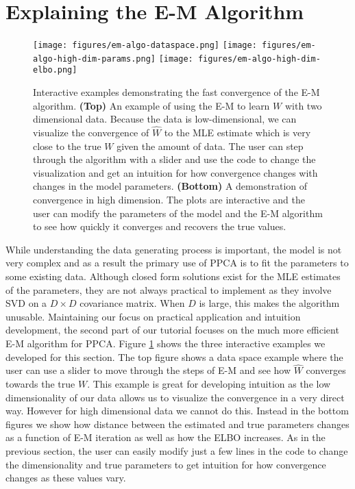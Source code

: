 \section{Explaining the E-M Algorithm}
\begin{figure}[h]
    \centering
    \texttt{[image: figures/em-algo-dataspace.png]}
    \texttt{[image: figures/em-algo-high-dim-params.png]}
    \texttt{[image: figures/em-algo-high-dim-elbo.png]}
    \caption{Interactive examples demonstrating the fast convergence of the E-M algorithm. \textbf{(Top)} An example of using the E-M to learn $W$ with two dimensional data. Because the data is low-dimensional, we can visualize the convergence of $\hat{W}$ to the MLE estimate which is very close to the true $W$ given the amount of data. The user can step through the algorithm with a slider and use the code to change the visualization and get an intuition for how convergence changes with changes in the model parameters. \textbf{(Bottom)} A demonstration of convergence in high dimension. The plots are interactive and the user can modify the parameters of the model and the E-M algorithm to see how quickly it converges and recovers the true values.}
    \label{fig:em}
\end{figure}
While understanding the data generating process is important, the model is not very complex and as a result the primary use of PPCA is to fit the parameters to some existing data. Although closed form solutions exist for the MLE estimates of the parameters, they are not always practical to implement as they involve SVD on a $D\times D$ covariance matrix. When $D$ is large, this makes the algorithm unusable. Maintaining our focus on practical application and intuition development, the second part of our tutorial focuses on the much more efficient E-M algorithm for PPCA. Figure \ref{fig:em} shows the three interactive examples we developed for this section. The top figure shows a data space example where the user can use a slider to move through the steps of E-M and see how $\hat{W}$ converges towards the true $W$. This example is great for developing intuition as the low dimensionality of our data allows us to visualize the convergence in a very direct way. However for high dimensional data we cannot do this. Instead in the bottom figures we show how distance between the estimated and true parameters changes as a function of E-M iteration as well as how the ELBO increases. As in the previous section, the user can easily modify just a few lines in the code to change the dimensionality and true parameters to get intuition for how convergence changes as these values vary. 

